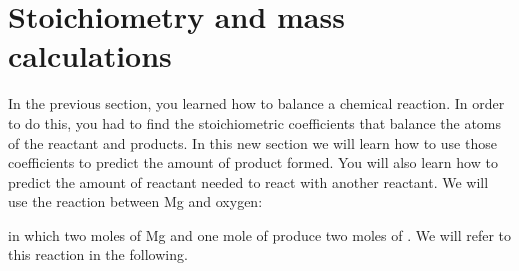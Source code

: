 \documentclass[main.tex]{subfiles}
\begin{document}
\section{Stoichiometry and mass calculations}
In the previous section, you learned how to balance a chemical reaction. In order to do this, you had to find the stoichiometric coefficients that balance the atoms of the reactant and products. In this new section we will learn how to use those coefficients to predict the amount of product formed. You will also learn how to predict the amount of reactant needed to react with another reactant. We will use the reaction between Mg and oxygen:
\begin{center}\end{center}
in which two moles of Mg and one mole of  produce two moles of . We will refer to this reaction in the following.
\sloppy 
\end{document}
